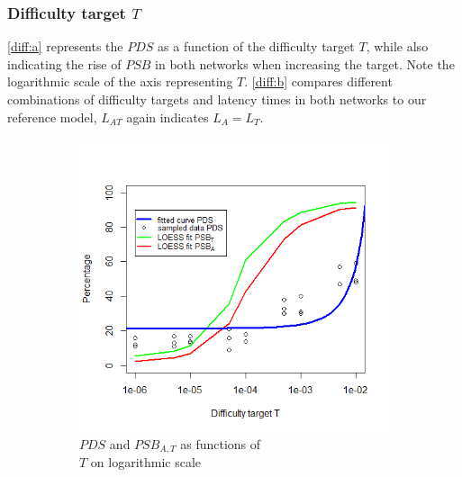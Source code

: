 \documentclass[a4paper,12pt,twoside]{report}
\begin{document}
\subsubsection{Difficulty target $T$}
\autoref{diff:a} represents the $PDS$ as a function of the difficulty target $T$, while also indicating the rise of $PSB$ in both networks when increasing the target. Note the logarithmic scale of the axis representing $T$. \autoref{diff:b} compares different combinations of difficulty targets and latency times in both networks to our reference model, $L_{AT}$ again indicates $L_{A} = L_{T}$.\begin{figure}[hb!]
\centering
\begin{subfigure}{.5\textwidth}
  \centering
  \includegraphics[width=\linewidth]{Experiments/Difficulty/difficultyfit.png}
  \caption{$PDS$ and $PSB_{A,T}$ as functions of \\ $T$ on logarithmic scale}
  \label{diff:a}
\end{subfigure}%
\begin{subfigure}{.5\textwidth}
  \centering

\end{subfigure}
\end{figure}
\end{document}
